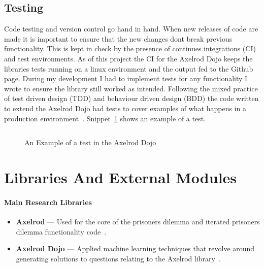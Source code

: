 \subsection{Testing}\label{ssec:testing}
Code testing and version control go hand in hand. 
When new releases of code are made it is important to ensure that the new changes dont break previous functionality.
This is kept in check by the presence of continues integrations (CI) and test environments.
As of this project the CI for the Axelrod Dojo keeps the libraries tests running on a linux environment and the output fed to the Github page.
During my development I had to implement tests for any functionality I wrote to ensure the library still worked as intended.
Following the mixed practice of test driven design (TDD) and behaviour driven design (BDD) the code written to extend the Axelrod Dojo had tests to cover examples of what happens in a production environment~\cite{hong2015top, prlic2012ten, sandve2013ten}.
Snippet~\ref{code:test-example} shows an example of a test.

\begin{figure}[ht]
    \inputminted{python}{code_snippets/dev-examples/example-test.py}
    \caption{An Example of a test in the Axelrod Dojo}\label{code:test-example}
\end{figure}

\section{Libraries And External Modules}
\paragraph{Main Research Libraries}
\begin{itemize}
    \item \textbf{Axelrod} --- Used for the core of the prisoners dilemma and iterated prisoners dilemma functionality code~\cite{axelrodproject}.
    \item \textbf{Axelrod Dojo} --- Applied machine learning techniques that revolve around generating solutions to questions relating to the Axelrod library~\cite{dojoV008}.
\end{itemize}

